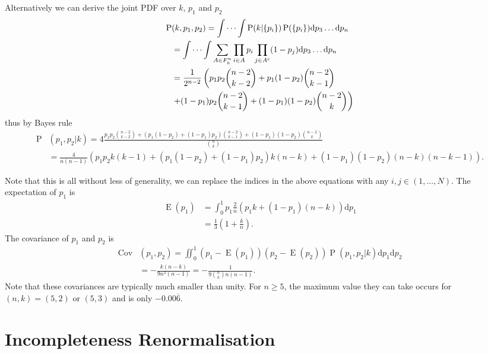 \documentclass[fleqn,usenatbib]{mnras}
\begin{document}
Alternatively we can derive the joint PDF over $k$, $p_1$ and $p_2$
\begin{align}
    \operatorname{P}&(k,p_1,p_2) = \idotsint \operatorname{P}(k|\{p_i\}) \operatorname{P}(\{p_i\})\mathrm{d}p_3 \dots \mathrm{d}p_n  \\
    &= \idotsint \sum_{A\in F_k^n} \prod_{i\in A} p_i \prod_{j\in A^{\mathrm{c}}} (1-p_j) \mathrm{d}p_3 \dots \mathrm{d}p_n \\
    &= \frac{1}{2^{n-2}} \left( p_1p_2 \binom{n-2}{k-2} + p_1(1-p_2)\binom{n-2}{k-1}\right. \\
    &\left.+ (1-p_1)p_2\binom{n-2}{k-1}+(1-p_1)(1-p_2)\binom{n-2}{k} \right) \\
\end{align}
thus by Bayes rule
\begin{align}
    \operatorname{P}&(p_1,p_2|k) = 4\frac{p_1p_2 \binom{n-2}{k-2} + (p_1(1-p_2)+ (1-p_1)p_2)\binom{n-2}{k-1}+(1-p_1)(1-p_2)\binom{n-2}{k}}{\binom{n}{k}} \\
    &= \frac{4}{n(n-1)}\left(p_1p_2k(k-1)+(p_1(1-p_2)+ (1-p_1)p_2)k(n-k) +(1-p_1)(1-p_2)(n-k)(n-k-1) \right).
\end{align}

Note that this is all without less of generality, we can replace the indices in the above equations with any $i,j\in (1,\dots,N)$. The expectation of $p_1$ is 
\begin{align}
    \operatorname{E}(p_1) &= \int_0^1 p_1 \frac{2}{n}\left(p_1k+(1-p_1)(n-k)\right) \mathrm{d}p_1 \\
    &= \frac{1}{3}(1+\frac{k}{n}).
\end{align}
The covariance of $p_1$ and $p_2$ is 
\begin{align}
    \operatorname{Cov}&(p_1,p_2) = \iint_0^1 (p_1-\operatorname{E}(p_1))(p_2-\operatorname{E}(p_2)) \operatorname{P}(p_1,p_2|k) \mathrm{d}p_1\mathrm{d}p_2 \\
    &= -\frac{k(n-k)}{9n^2(n-1)} = -\frac{1}{9\binom{n}{k}n(n-1)}.
\end{align}
Note that these covariances are typically much smaller than unity. For $n\geq5$, the maximum value they can take occurs for $(n,k)=(5,2)$ or $(5,3)$ and is only $-0.00\overline{6}$.

\section{Incompleteness Renormalisation}
\end{document}
